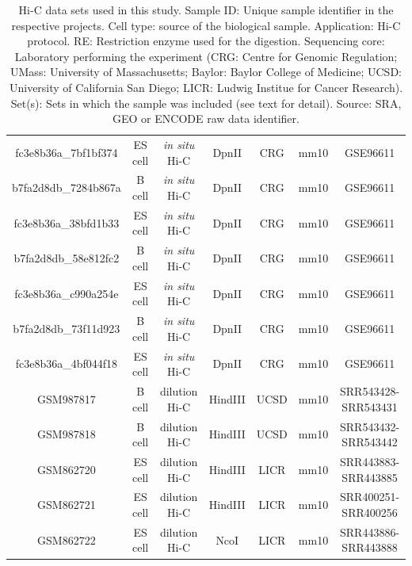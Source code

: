\documentclass{article}
\begin{document}
\begin{landscape}
\begin{table}
{\begin{tabular}{ccccccc}
fc3e8b36a\_7bf1bf374 & ES cell & \textit{in situ} Hi-C &
  DpnII & CRG & mm10 & GSE96611 \\
b7fa2d8db\_7284b867a & B cell  & \textit{in situ} Hi-C &
  DpnII & CRG & mm10 & GSE96611 \\
fc3e8b36a\_38bfd1b33 & ES cell & \textit{in situ} Hi-C &
  DpnII & CRG & mm10 & GSE96611 \\
b7fa2d8db\_58e812fc2 & B cell  & \textit{in situ} Hi-C &
  DpnII & CRG & mm10 & GSE96611 \\
fc3e8b36a\_c990a254e & ES cell & \textit{in situ} Hi-C &
  DpnII & CRG & mm10 & GSE96611 \\
b7fa2d8db\_73f11d923 & B cell  & \textit{in situ} Hi-C &
  DpnII & CRG & mm10 & GSE96611 \\
fc3e8b36a\_4bf044f18 & ES cell & \textit{in situ} Hi-C &
  DpnII & CRG & mm10 & GSE96611 \\
GSM987817 & B cell  & dilution Hi-C &
  HindIII & UCSD & mm10 & SRR543428-SRR543431 \\
GSM987818 & B cell  & dilution Hi-C &
  HindIII & UCSD & mm10 & SRR543432-SRR543442 \\
GSM862720 & ES cell & dilution Hi-C &
  HindIII & LICR & mm10 & SRR443883-SRR443885 \\
GSM862721 & ES cell & dilution Hi-C &
  HindIII & LICR & mm10 & SRR400251-SRR400256 \\
GSM862722 & ES cell & dilution Hi-C &
  NcoI    & LICR & mm10 & SRR443886-SRR443888 \\
  \hline
\end{tabular}}{}
\caption{Hi-C data sets used in this study. Sample ID: Unique sample
identifier in the respective projects. Cell type: source of the biological
sample. Application: Hi-C protocol. RE: Restriction enzyme used for the
digestion. Sequencing core: Laboratory performing the experiment (CRG:
Centre for Genomic Regulation; UMass: University of Massachusetts; Baylor:
Baylor College of Medicine; UCSD: University of California San Diego;
LICR: Ludwig Institue for Cancer Research). Set(s): Sets in which the
sample was included (see text for detail).  Source: SRA, GEO or ENCODE raw
data identifier.}
\end{table}

\end{landscape}

\end{document}

